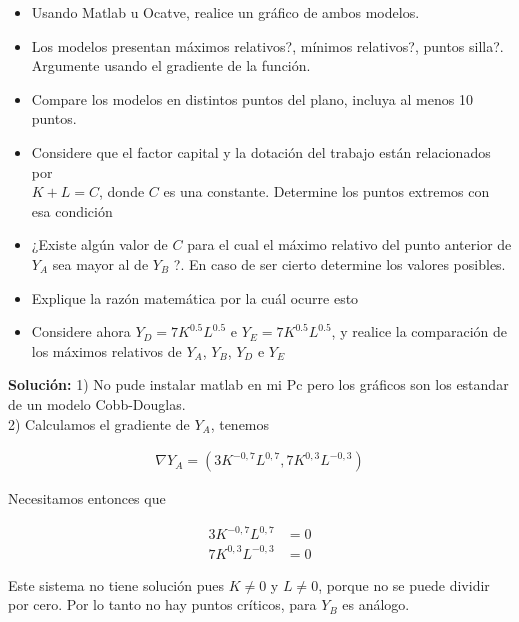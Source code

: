 \documentclass{article}
\theoremstyle{definition}
\begin{document}
\begin{itemize}
    \item Usando Matlab u Ocatve, realice un gráfico de ambos modelos.
    \item Los modelos presentan máximos relativos?, mínimos relativos?, puntos silla?. Argumente usando el gradiente de la función. 
    \item Compare los modelos en distintos puntos del plano, incluya al menos 10 puntos.
    \item Considere que el factor capital y la dotación del trabajo están relacionados por \\$K+L=C$, donde $C$ es una constante. Determine  los puntos extremos con esa condición
    \item ¿Existe algún valor de $C$ para el cual el máximo relativo del punto anterior de $Y_A$ sea mayor al de $Y_B$ ?. En caso de ser cierto determine los valores posibles.
    \item Explique la razón matemática por la cuál ocurre esto 
    \item Considere ahora $Y_D = 7K^{0.5}L^{0.5}$ e $Y_E = 7K^{0.5}L^{0.5}$, y realice la comparación de los máximos relativos de $Y_A$, $Y_B$, $Y_D$ e $Y_E$
\end{itemize}









\newpage


\textbf{Solución: } 1) No pude instalar matlab en mi Pc pero los gráficos son los estandar de un modelo Cobb-Douglas. \\



2) Calculamos el gradiente de $Y_A$, tenemos

\begin{align*}
    \nabla Y_A = (3K^{-0,7}L^{0,7},7K^{0,3}L^{-0,3})
\end{align*}

Necesitamos entonces que

\begin{align*}
    3K^{-0,7}L^{0,7} &=0 \\
    7K^{0,3}L^{-0,3} &=0
\end{align*}

Este sistema no tiene solución pues $K \neq 0$ y $L \neq 0$, porque no se puede dividir por cero. Por lo tanto no hay puntos críticos, para $Y_B$ es análogo.\\ \\
\end{document}
